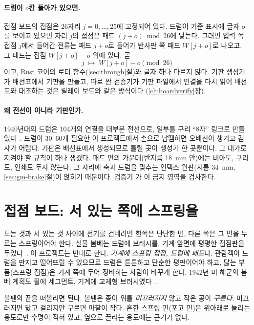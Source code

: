 \paragraph{드럼이 $o$칸 돌아가 있으면.} 접점 보드의 접점은 26자리 $j = 0,\ldots,25$에 고정되어 있다. 드럼이 기준
표시에 글자 $o$를 보이고 있으면 자리 $j$의 접점은 패드 $(j + o) \bmod 26$에 닿는다. 그러면 입력 쪽 접점 $j$에서
들어간 전류는 패드 $j+o$로 들어가 반사판 쪽 패드 $W[j+o]$로 나오고, 그 패드는 접점 $W[j+o] - o$ 위에 있다. 곧
\[
  j \;\longmapsto\; W[j+o] - o \pmod{26}
\]
이고, Rust 코어의 로터 함수(\ref{sec:through}절)와 글자 하나 다르지 않다. 기판 생성기가 배선표에서 기판을 만들고,
따로 짠 검증기가 기판 파일에서 연결을 다시 읽어 배선표와 대조하는 것은 릴레이 보드와 같은 방식이다
(\ref{ch:boardverify}장).

\paragraph{왜 전선이 아니라 기판인가.} 1940년대의 드럼은 104개의 연결을 대부분 전선으로, 일부를 구리 ``8자'' 링크로
만들었다~\cite{bombe-rebuild-drums}. 드럼이 30--60개 필요한 이 프로젝트에서 손으로 납땜하면 오배선이 생기고
검사가 어렵다. 기판은 배선표에서 생성되므로 틀릴 곳이 생성기 한 곳뿐이다. 그 대가로 지켜야 할 규칙이 하나 생겼다.
패드 면의 가운데(반지름 18~mm 안)에는 비아도, 구리도, 인쇄도 두지 않는다. 그 자리에 축과 드럼을 맞추는 인덱스
원판(지름 34~mm, \ref{sec:gm-brake}절)이 얹히기 때문이다. 검증기 가 이 금지 영역을 검사한다.

\section{접점 보드: 서 있는 쪽에 스프링을}\label{sec:gm-contact}

\Why 도는 것과 서 있는 것 사이에 전기를 건네려면 한쪽은 단단한 면, 다른 쪽은 그 면을 누르는 스프링이어야 한다.
실물 봄베는 드럼에 브러시를, 기계 앞면에 평평한 접점판을 두었다~\cite{us6812report1944}. 이 프로젝트는 반대로 한다.
\emph{기계에 스프링 접점, 드럼에 패드}다. 관람객이 드럼을 만지고 떨어뜨릴 수 있으므로 드럼은 튼튼하고 단순한 평판이어야
하고, 닳는 부품(스프링 접점)은 기계 쪽에 두어 정비하는 사람이 바꾸게 한다. 1942년 미 해군의 봄베 계획도 휠에
세그먼트, 기계에 교체형 브러시였다~\cite{desch1942memo}.

\General 볼펜의 끝을 떠올리면 된다. 볼펜은 종이 위를 \emph{미끄러지지} 않고 작은 공이 \emph{구른다}. 미끄러지면
닳고 걸리지만 구르면 마찰이 작다. 흔한 스프링 핀(포고 핀)은 위아래로 눌리는 용도로만 수명이 적혀 있고, 옆으로
끌리는 용도에는 근거가 없다.

